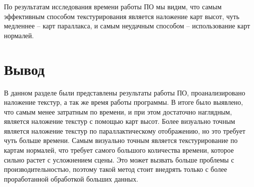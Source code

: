 По результатам исследования времени работы ПО мы видим, что самым эффективным способом текстурирования является наложение карт высот, чуть медленнее -- карт параллакса, и самым неудачным способом -- использование карт нормалей.

\section*{Вывод}
В данном разделе были представлены результаты работы ПО, проанализировано наложение текстур, а так же время работы программы. В итоге было выявлено, что самым менее затратным по времени, и при этом достаточно наглядным, является наложение текстур с помощью карт высот. Более визуально точным является наложение текстур по параллактическому отображению, но это требует чуть больше времени. Самым визуально точным является текстурирование по картам нормалей, что требует самого большого количества времени, которое сильно растет с усложнением сцены. Это может вызвать больше проблемы с производительностью, поэтому такой метод стоит внедрять только с более проработанной обработкой больших данных.